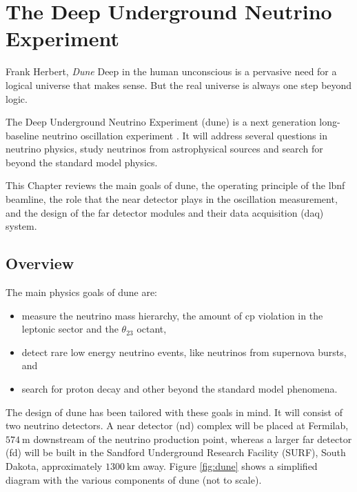 \chapter{The Deep Underground Neutrino Experiment}
\label{chapter:dune}

\begin{chapquote}{Frank Herbert, \textit{Dune}}
	Deep in the human unconscious is a pervasive need for a logical universe that makes sense. But the real universe is always one step beyond logic.
\end{chapquote}

The Deep Underground Neutrino Experiment (\gls{dune}) is a next generation long-baseline neutrino oscillation experiment \cite{DUNE2020TDR1}. It will address several questions in neutrino physics, study neutrinos from astrophysical sources and search for beyond the standard model physics.

This Chapter reviews the main goals of \gls{dune}, the operating principle of the \gls{lbnf} beamline, the role that the near detector plays in the oscillation measurement, and the design of the far detector modules and their data acquisition (\gls{daq}) system.

\section{Overview}

The main physics goals of \gls{dune} are:
\begin{itemize}
	\item measure the neutrino mass hierarchy, the amount of \gls{cp} violation in the leptonic sector and the $\theta_{23}$ octant,
	\item detect rare low energy neutrino events, like neutrinos from supernova bursts, and
	\item search for proton decay and other beyond the standard model phenomena.
\end{itemize}

The design of \gls{dune} has been tailored with these goals in mind. It will consist of two neutrino detectors. A near detector (\gls{nd}) complex will be placed at Fermilab, $574~\mathrm{m}$ downstream of the neutrino production point, whereas a larger far detector (\gls{fd}) will be built in the Sandford Underground Research Facility (SURF), South Dakota, approximately $1300~\mathrm{km}$ away. Figure \ref{fig:dune} shows a simplified diagram with the various components of \gls{dune} (not to scale).

